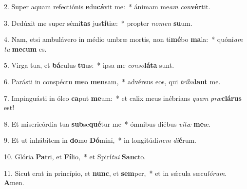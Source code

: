2. Super aquam refectiónis \textbf{e}du\textbf{cá}vit me:~*  ánimam me\textit{am} \textit{con}\textbf{vér}tit.\

3. Dedúxit me super sémi\textbf{tas} jus\textbf{tí}tiæ:~*  propter \textit{no}\textit{men} \textbf{su}um.\

4. Nam, etsi ambulávero in médio umbræ mortis, non ti\textbf{mé}bo \textbf{ma}la:~*  quóni\textit{am} \textit{tu} \textbf{me}\textbf{cum} es.\

5. Virga tua, et \textbf{bá}culus \textbf{tu}us:~*  ipsa me \textit{con}\textit{so}\textbf{lá}\textbf{ta} sunt.\

6. Parásti in conspéctu \textbf{me}o \textbf{men}sam,~*  advérsus eos, qui \textit{trí}\textit{bu}\textbf{lant} me.\

7. Impinguásti in óleo \textbf{ca}put \textbf{me}um:~*  et calix meus inébrians \textit{quam} \textit{præ}\textbf{clá}\textbf{rus} est!\

8. Et misericórdia tua \textbf{sub}se\textbf{qué}tur me~*  ómnibus diébus \textit{vi}\textit{tæ} \textbf{me}æ.\

9. Et ut inhábitem in \textbf{do}mo \textbf{Dó}mini,~*  in longitúdi\textit{nem} \textit{di}\textbf{é}rum.\

10. Glória \textbf{Pa}tri, et \textbf{Fí}lio,~*  et Spirí\textit{tu}\textit{i} \textbf{Sanc}to.\

11. Sicut erat in princípio, et \textbf{nunc}, et \textbf{sem}per,~*  et in sǽcula sæcu\textit{ló}\textit{rum}. \textbf{A}men.\

